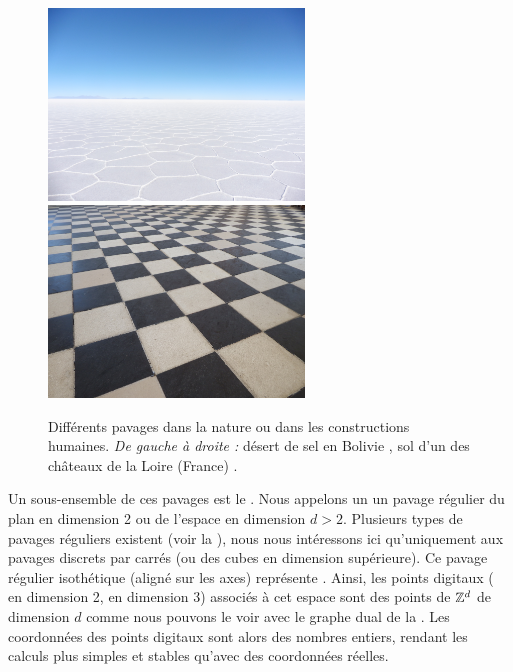 \begin{figure}[ht]
  \begin{center}
    \includegraphics[width=6.8cm]{images/Notions/pavage_mer_de_sel}
    \includegraphics[width=6.8cm]{images/Notions/pavage_chateau}
    \caption[Différents pavages dans la nature ou dans les constructions humaines]{Différents pavages dans la nature ou dans les constructions humaines. \emph{De gauche à droite :} désert de sel en Bolivie \cite{pavage1}, sol d'un des châteaux de la Loire (France) \cite{pavage2}.\label{fig:pavage-exemple}}
  \end{center}
\end{figure}

Un sous-ensemble de ces pavages est le . Nous appelons
un  un pavage régulier du plan en dimension 2 ou de
l'espace en dimension $d > 2$. Plusieurs types de pavages réguliers existent
(voir la ), nous nous intéressons ici qu'uniquement aux
pavages discrets par carrés (ou des cubes en dimension supérieure). Ce pavage
régulier isothétique (aligné sur les axes) représente . Ainsi, les points digitaux ( en dimension 2,
 en dimension 3) associés à cet espace sont des points de
$\mathbb{Z}^d$ de dimension $d$ comme nous pouvons le voir avec le graphe dual de la
. Les coordonnées des points digitaux sont alors des
nombres entiers, rendant les calculs plus simples et stables qu'avec des
coordonnées réelles.


